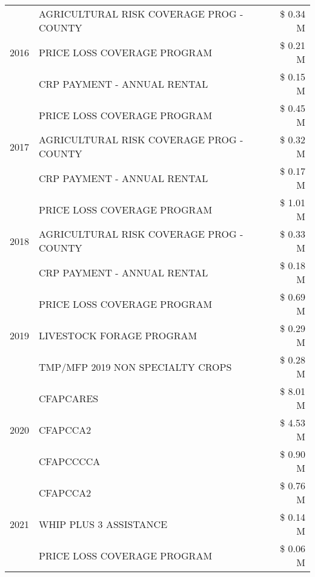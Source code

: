 \begin{tabular}{llr}
\cline{1-3}
\multirow[t]{3}{*}{2016} & AGRICULTURAL RISK COVERAGE PROG - COUNTY      & \$ 0.34 M \\
 & PRICE LOSS COVERAGE PROGRAM                   & \$ 0.21 M \\
 & CRP PAYMENT - ANNUAL RENTAL                   & \$ 0.15 M \\
\cline{1-3}
\multirow[t]{3}{*}{2017} & PRICE LOSS COVERAGE PROGRAM & \$ 0.45 M \\
 & AGRICULTURAL RISK COVERAGE PROG - COUNTY & \$ 0.32 M \\
 & CRP PAYMENT - ANNUAL RENTAL & \$ 0.17 M \\
\cline{1-3}
\multirow[t]{3}{*}{2018} & PRICE LOSS COVERAGE PROGRAM & \$ 1.01 M \\
 & AGRICULTURAL RISK COVERAGE PROG - COUNTY & \$ 0.33 M \\
 & CRP PAYMENT - ANNUAL RENTAL & \$ 0.18 M \\
\cline{1-3}
\multirow[t]{3}{*}{2019} & PRICE LOSS COVERAGE PROGRAM & \$ 0.69 M \\
 & LIVESTOCK FORAGE PROGRAM & \$ 0.29 M \\
 & TMP/MFP 2019 NON SPECIALTY CROPS & \$ 0.28 M \\
\cline{1-3}
\multirow[t]{3}{*}{2020} & CFAPCARES & \$ 8.01 M \\
 & CFAPCCA2 & \$ 4.53 M \\
 & CFAPCCCCA & \$ 0.90 M \\
\cline{1-3}
\multirow[t]{3}{*}{2021} & CFAPCCA2 & \$ 0.76 M \\
 & WHIP PLUS 3 ASSISTANCE & \$ 0.14 M \\
 & PRICE LOSS COVERAGE PROGRAM & \$ 0.06 M \\
\cline{1-3}
\bottomrule
\end{tabular}
